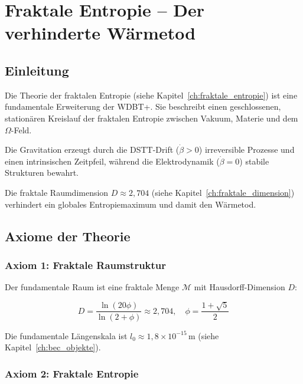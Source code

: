 
\chapter{Fraktale Entropie – Der verhinderte Wärmetod}
\label{app:fraktale_entropie}

\section{Einleitung}
\label{app:fraktale_entropie_einleitung}

Die Theorie der fraktalen Entropie (siehe Kapitel~\ref{ch:fraktale_entropie}) ist eine fundamentale Erweiterung der WDBT+. Sie beschreibt einen geschlossenen, stationären Kreislauf der fraktalen Entropie zwischen Vakuum, Materie und dem \( \Omega \)-Feld.

Die Gravitation erzeugt durch die DSTT-Drift (\( \dot{\beta} > 0 \)) irreversible Prozesse und einen intrinsischen Zeitpfeil, während die Elektrodynamik (\( \dot{\beta} = 0 \)) stabile Strukturen bewahrt.

Die fraktale Raumdimension \( D \approx 2,704 \) (siehe Kapitel~\ref{ch:fraktale_dimension}) verhindert ein globales Entropiemaximum und damit den Wärmetod.

\section{Axiome der Theorie}
\label{app:fraktale_entropie_axiome}

\subsection{Axiom 1: Fraktale Raumstruktur}
\label{sub:fraktale_entropie_axiom1}

Der fundamentale Raum ist eine fraktale Menge \( \mathcal{M} \) mit Hausdorff-Dimension \( D \):

\[
D = \frac{\ln(20\phi)}{\ln(2 + \phi)} \approx 2,704, \quad \phi = \frac{1 + \sqrt{5}}{2} \tag{L.1}
\]

Die fundamentale Längenskala ist \( l_0 \approx 1,8 \times 10^{-15}\,\text{m} \) (siehe Kapitel~\ref{ch:bec_objekte}).

\subsection{Axiom 2: Fraktale Entropie}
\label{sub:fraktale_entropie_axiom2}

